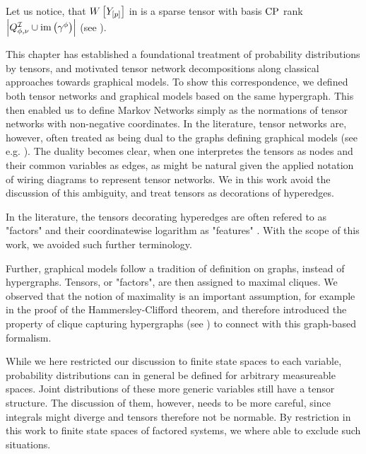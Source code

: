 Let us notice, that $W\left[Y_{[p]}\right]$ in  is a sparse tensor with basis $\mathrm{CP}$ rank $\left|Q^{\mathcal{I}}_{\phi,\nu}\cup\mathrm{im}\left(\gamma^{\phi}\right)\right|$ (see ).



This chapter has established a foundational treatment of probability distributions by tensors, and motivated tensor network decompositions along classical approaches towards graphical models.
To show this correspondence, we defined both tensor networks and graphical models based on the same hypergraph.
This then enabled us to define Markov Networks simply as the normations of tensor networks with non-negative coordinates.
In the literature, tensor networks are, however, often treated as being dual to the graphs defining graphical models (see e.g. \cite{robeva_duality_2019}).
The duality becomes clear, when one interpretes the tensors as nodes and their common variables as edges, as might be natural given the applied notation of wiring diagrams to represent tensor networks.
We in this work avoid the discussion of this ambiguity, and treat tensors as decorations of hyperedges.

In the literature, the tensors decorating hyperedges are often refered to as "factors" and their coordinatewise logarithm as "features" \cite{koller_probabilistic_2009}.
With the scope of this work, we avoided such further terminology.

Further, graphical models follow a tradition of definition on graphs, instead of hypergraphs.
Tensors, or "factors", are then assigned to maximal cliques.
We observed that the notion of maximality is an important assumption, for example in the proof of the Hammersley-Clifford theorem, and therefore introduced the property of clique capturing hypergraphs (see ) to connect with this graph-based formalism.

While we here restricted our discussion to finite state spaces to each variable, probability distributions can in general be defined for arbitrary measureable spaces.
Joint distributions of these more generic variables still have a tensor structure.
The discussion of them, however, needs to be more careful, since integrals might diverge and tensors therefore not be normable.
By restriction in this work to finite state spaces of factored systems, we where able to exclude such situations.








